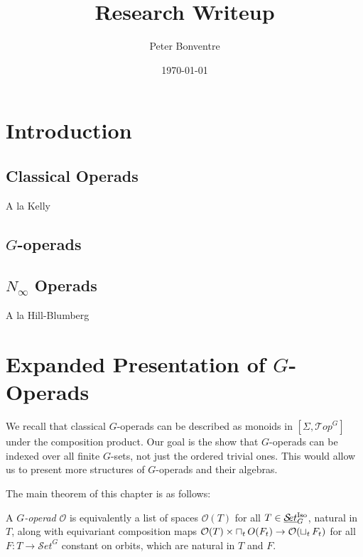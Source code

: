 \documentclass{report}
\title{Research Writeup}
\author{Peter Bonventre}
\date{\today}
\newcommand{\Top}{\text{$\mathcal{T}\!op$}}
\newcommand{\Set}{\text{$\mathcal{S}\!et$}}
\newcommand{\TopG}{\text{\underline{$\Top$}$_G$}}
\newcommand{\SetG}{\text{\underline{$\Set$}$_G^{\mbox{\scriptsize Iso}}$}}
\renewcommand{\smash}{\text{$\land$}}
\newcommand{\icap}{\operatornamewithlimits{\sqcap}}
\newcommand{\ico}{\operatornamewithlimits{\sqcup}}
\renewcommand{\O}{\text{$\mathcal{O}$}}
\begin{document}
\maketitle

\onehalfspacing

\tableofcontents


\renewcommand{\smash}{\text{\,$\land$\,}}%

\chapter{Introduction}
\section{Classical Operads}
A la Kelly
\section{$G$-operads}

\section{$N_\infty$ Operads}
A la Hill-Blumberg \citep{blumberg_operadic_2013}

\chapter{Expanded Presentation of $G$-Operads}

We recall that classical $G$-operads can be described as monoids in $[\Sigma,\Top^G]$ under the composition product. Our goal is the show that $G$-operads can be indexed over all finite $G$-sets, not just the ordered trivial ones. This would allow us to present more structures of $G$-operads and their algebras.

The main theorem of this chapter is as follows:
\begin{theorem}
  A {\em $G$-operad} $\O$ is equivalently a list of spaces $\O(T)$ for all $T\in\SetG$, natural in $T$, along with equivariant composition maps $\O(T)\times\icap_tO(F_t)\to\O(\ico_tF_t)$ for all $F: T\to \Set^G$ constant on orbits, which are natural in $T$ and $F$.
\end{theorem}


\end{document}
